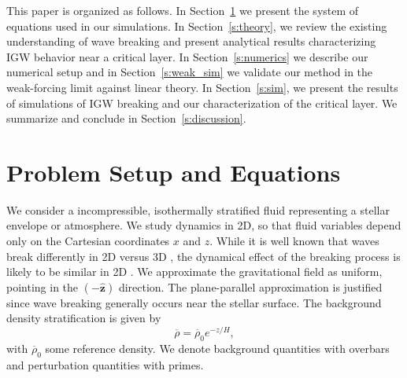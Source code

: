 \documentclass[
        fleqn,
        usenatbib,
    ]{mnras}
\newcommand*{\uv}[1]{\hat{\mathbf{#1}}}
\begin{document}
This paper is organized as follows. In Section~\ref{s:equations} we present the
system of equations used in our simulations. In Section~\ref{s:theory}, we
review the existing understanding of wave breaking and present analytical
results characterizing IGW behavior near a critical layer. In
Section~\ref{s:numerics} we describe our numerical setup and in
Section~\ref{s:weak_sim} we validate our method in the weak-forcing limit
against linear theory. In Section~\ref{s:sim}, we present the results of
simulations of IGW breaking and our characterization of the critical layer. We
summarize and conclude in Section~\ref{s:discussion}.

\section{Problem Setup and Equations}\label{s:equations}

We consider a incompressible, isothermally stratified fluid representing a
stellar envelope or atmosphere. We study dynamics in 2D, so that fluid variables
depend only on the Cartesian coordinates $x$ and $z$. While it
is well known that waves break differently in 2D versus 3D \citep{klostermeyer,
winters1994}, the dynamical effect of the breaking process is likely to be
similar in 2D \citep{barker_ogilvie}. We approximate the gravitational field as
uniform, pointing in the $(-\uv{z})$ direction. The plane-parallel approximation
is justified since wave breaking generally occurs near the stellar surface. The
background density stratification is given by
\begin{equation}
    \overline{\rho} = \overline{\rho}_0 e^{-z/H},
\end{equation}
with $\overline{\rho}_0$ some reference density. We denote background quantities
with overbars and perturbation quantities with primes.
\end{document}
